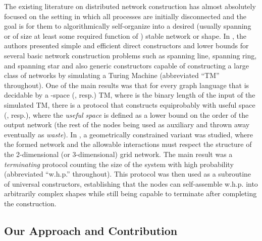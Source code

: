 \documentclass[preprint]{elsarticle}
\begin{document}
The existing literature on distributed network construction \cite{MS14,Mi15} has almost absolutely focused on the setting in which all processes are initially disconnected and the goal is for them to algorithmically self-organize into a desired (usually spanning or of size at least some required function of ) stable network or shape. In \cite{MS14}, the authors presented simple and efficient direct constructors and lower bounds for several basic network construction problems such as spanning line, spanning ring, and spanning star and also generic constructors capable of constructing a large class of networks by simulating a Turing Machine (abbreviated ``TM'' throughout). One of the main results was that for every graph language  that is decidable by a -space (, resp.) TM, where  is the binary length of the input of the simulated TM, there is a protocol that constructs  equiprobably with useful space  (, resp.), where the \emph{useful space} is defined as a lower bound on the order of the output network (the rest of the nodes being used as auxiliary and thrown away eventually as \emph{waste}). In \cite{Mi15}, a geometrically constrained variant was studied, where the formed network and the allowable interactions must respect the structure of the 2-dimensional (or 3-dimensional) grid network. The main result was a \emph{terminating} protocol counting the size  of the system with high probability (abbreviated ``w.h.p.'' throughout). This protocol was then used as a subroutine of universal constructors, establishing that the nodes can self-assemble w.h.p. into arbitrarily complex shapes while still being capable to terminate after completing the construction.

\subsection{Our Approach and Contribution}
\end{document}
